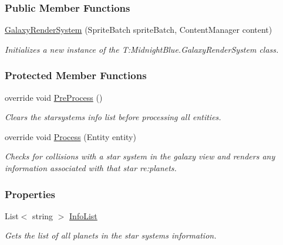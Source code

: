 \subsubsection*{Public Member Functions}
\begin{DoxyCompactItemize}
\item 
\hyperlink{class_midnight_blue_1_1_galaxy_render_system_aee5d42f0287d1bfed669e2a2656c5c28}{Galaxy\+Render\+System} (Sprite\+Batch sprite\+Batch, Content\+Manager content)
\begin{DoxyCompactList}\small\item\em Initializes a new instance of the T\+:\+Midnight\+Blue.\+Galaxy\+Render\+System class. \end{DoxyCompactList}\end{DoxyCompactItemize}
\subsubsection*{Protected Member Functions}
\begin{DoxyCompactItemize}
\item 
override void \hyperlink{class_midnight_blue_1_1_galaxy_render_system_a269f042fe0c55e47f3b23cc1930ed71a}{Pre\+Process} ()
\begin{DoxyCompactList}\small\item\em Clears the starsystems info list before processing all entities. \end{DoxyCompactList}\item 
override void \hyperlink{class_midnight_blue_1_1_galaxy_render_system_aabbf61a4bcfb7c026d2d0c9fbe90569f}{Process} (Entity entity)
\begin{DoxyCompactList}\small\item\em Checks for collisions with a star system in the galaxy view and renders any information associated with that star re\+:planets. \end{DoxyCompactList}\end{DoxyCompactItemize}
\subsubsection*{Properties}
\begin{DoxyCompactItemize}
\item 
List$<$ string $>$ \hyperlink{class_midnight_blue_1_1_galaxy_render_system_a2f252c64ec38b5bcf20c6b276fd5809b}{Info\+List}
\begin{DoxyCompactList}\small\item\em Gets the list of all planets in the star system\textquotesingle{}s information. \end{DoxyCompactList}\end{DoxyCompactItemize}


